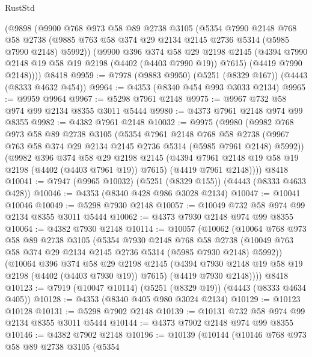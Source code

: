 \begin{lexlean}{RustStd}
\begin{coremodule}
    (@9898
      (@9900
        @768
        @973
        @58
        @89
        @2738
        @3105
        (@5354
          @7990
          @2148
          @768
          @58
          @2738
          (@9885 @763 @58 @374 @29 @2134 @2145 @2736 @5314 (@5985 @7990 @2148) @5992))
        (@9900
          @396
          @374
          @58
          @29
          @2198
          @2145
          (@4394 @7990 @2148 @19 @58 @19 @2198 (@4402 (@4403 @7990 @19)) @7615)
          (@4419 @7990 @2148))))
    @8418
@9959 := @7978 (@9883 @9950) (@5251 (@8329 @167)) (@4443 (@8333 @4632 @454))
@9964 := @4353 (@8340 @454 @993 @3033 @2134)
@9965 := @9959 @9964
@9967 := @5298 @7961 @2148
@9975 := @9967 @732 @58 @974 @99 @2134 @8355 @3011 @5444
@9980 := @4373 @7961 @2148 @974 @99 @8355
@9982 := @4382 @7961 @2148
@10032 := @9975
    (@9980
      (@9982
        @768
        @973
        @58
        @89
        @2738
        @3105
        (@5354
          @7961
          @2148
          @768
          @58
          @2738
          (@9967 @763 @58 @374 @29 @2134 @2145 @2736 @5314 (@5985 @7961 @2148) @5992))
        (@9982
          @396
          @374
          @58
          @29
          @2198
          @2145
          (@4394 @7961 @2148 @19 @58 @19 @2198 (@4402 (@4403 @7961 @19)) @7615)
          (@4419 @7961 @2148))))
    @8418
@10041 := @7947 (@9965 @10032) (@5251 (@8329 @155)) (@4443 (@8333 @4633 @428))
@10046 := @4353 (@8340 @428 @986 @3028 @2134)
@10047 := @10041 @10046
@10049 := @5298 @7930 @2148
@10057 := @10049 @732 @58 @974 @99 @2134 @8355 @3011 @5444
@10062 := @4373 @7930 @2148 @974 @99 @8355
@10064 := @4382 @7930 @2148
@10114 := @10057
    (@10062
      (@10064
        @768
        @973
        @58
        @89
        @2738
        @3105
        (@5354
          @7930
          @2148
          @768
          @58
          @2738
          (@10049 @763 @58 @374 @29 @2134 @2145 @2736 @5314 (@5985 @7930 @2148) @5992))
        (@10064
          @396
          @374
          @58
          @29
          @2198
          @2145
          (@4394 @7930 @2148 @19 @58 @19 @2198 (@4402 (@4403 @7930 @19)) @7615)
          (@4419 @7930 @2148))))
    @8418
@10123 := @7919 (@10047 @10114) (@5251 (@8329 @19)) (@4443 (@8333 @4634 @405))
@10128 := @4353 (@8340 @405 @980 @3024 @2134)
@10129 := @10123 @10128
@10131 := @5298 @7902 @2148
@10139 := @10131 @732 @58 @974 @99 @2134 @8355 @3011 @5444
@10144 := @4373 @7902 @2148 @974 @99 @8355
@10146 := @4382 @7902 @2148
@10196 := @10139
    (@10144
      (@10146
        @768
        @973
        @58
        @89
        @2738
        @3105
        (@5354

\end{coremodule}
\end{lexlean}
